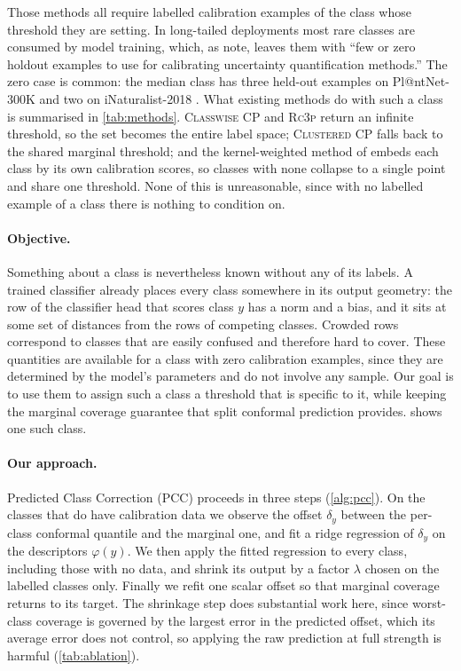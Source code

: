 Those methods all require labelled calibration examples of the class whose threshold they are
setting. In long-tailed deployments most rare classes are consumed by model training, which,
as \citet{ding2026conformal} note, leaves them with ``few or zero holdout examples to use for
calibrating uncertainty quantification methods.'' The zero case is common: the median class has three
held-out examples on Pl@ntNet-300K \cite{garcin2021plantnet} and two on iNaturalist-2018
\cite{vanhorn2018inaturalist}. What existing methods do with such a class is
summarised in \cref{tab:methods}. \textsc{Classwise} CP and \textsc{Rc3p} return an infinite
threshold, so the set becomes the entire label space; \textsc{Clustered} CP falls back to the
shared marginal threshold; and the kernel-weighted method of \citet{ding2026conformal} embeds
each class by its own calibration scores, so classes with none collapse to a single point and
share one threshold. None of this is unreasonable, since with no labelled example of a class
there is nothing to condition on.

\paragraph{Objective.} Something about a class is nevertheless known without any of its
labels. A trained classifier already places every class somewhere in its output geometry: the
row of the classifier head that scores class $y$ has a norm and a bias, and it sits at some
set of distances from the rows of competing classes. Crowded rows correspond to classes that
are easily confused and therefore hard to cover. These quantities are available for a class
with zero calibration examples, since they are determined by the model's parameters and do
not involve any sample. Our goal is to use them to assign such a class a threshold that is
specific to it, while keeping the marginal coverage guarantee that split conformal prediction
provides.  shows one such class.

\paragraph{Our approach.} Predicted Class Correction (PCC) proceeds in three steps
(\cref{alg:pcc}). On the
classes that do have calibration data we observe the offset $\delta_y$ between the per-class
conformal quantile and the marginal one, and fit a ridge regression of $\delta_y$ on the
descriptors $\varphi(y)$. We then apply the fitted regression to every class, including those
with no data, and shrink its output by a factor $\lambda$ chosen on the labelled classes only.
Finally we refit one scalar offset so that marginal coverage returns to its target. The
shrinkage step does substantial work here, since worst-class coverage is governed by the
largest error in the predicted offset, which its average error does not control, so applying
the raw prediction at full strength is harmful (\cref{tab:ablation}).


